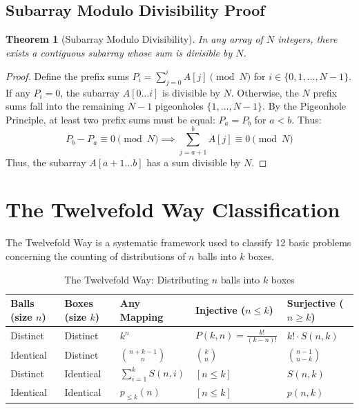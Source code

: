 \documentclass[10pt,journal,compsoc,onecolumn]{IEEEtran}
\newtheorem{theorem}{Theorem}
\begin{document}
\subsection{Subarray Modulo Divisibility Proof}
\begin{theorem}[Subarray Modulo Divisibility]
In any array of $N$ integers, there exists a contiguous subarray whose sum is divisible by $N$.
\end{theorem}

\begin{proof}
Define the prefix sums $P_i = \sum_{j=0}^{i} A[j] \pmod N$ for $i \in \{0, 1, \dots, N-1\}$. If any $P_i = 0$, the subarray $A[0 \dots i]$ is divisible by $N$. Otherwise, the $N$ prefix sums fall into the remaining $N-1$ pigeonholes $\{1, \dots, N-1\}$. By the Pigeonhole Principle, at least two prefix sums must be equal: $P_a = P_b$ for $a < b$. Thus:
\begin{equation}
P_b - P_a \equiv 0 \pmod N \implies \sum_{j=a+1}^{b} A[j] \equiv 0 \pmod N
\end{equation}
Thus, the subarray $A[a+1 \dots b]$ has a sum divisible by $N$.
\end{proof}

\section{The Twelvefold Way Classification}
\label{sec:twelvefold}

The Twelvefold Way is a systematic framework used to classify 12 basic problems concerning the counting of distributions of $n$ balls into $k$ boxes.

\begin{table}[h]
\centering
\caption{The Twelvefold Way: Distributing $n$ balls into $k$ boxes}
\label{tab:twelvefold}
\begin{tabular}{@{}lllll@{}}
\toprule
\textbf{Balls (size $n$)} & \textbf{Boxes (size $k$)} & \textbf{Any Mapping} & \textbf{Injective ($n \le k$)} & \textbf{Surjective ($n \ge k$)} \\ \midrule
Distinct & Distinct & $k^n$ & $P(k, n) = \frac{k!}{(k-n)!}$ & $k! \cdot S(n, k)$ \\
Identical & Distinct & $\binom{n+k-1}{n}$ & $\binom{k}{n}$ & $\binom{n-1}{n-k}$ \\
Distinct & Identical & $\sum_{i=1}^{k} S(n, i)$ & $[n \le k]$ & $S(n, k)$ \\
Identical & Identical & $p_{\le k}(n)$ & $[n \le k]$ & $p(n, k)$ \\ \bottomrule
\end{tabular}
\end{table}
\end{document}
